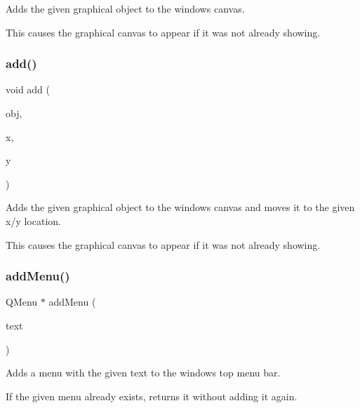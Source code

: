 Adds the given graphical object to the window\textquotesingle{}s canvas. 

This causes the graphical canvas to appear if it was not already showing. \mbox{\label{classsgl_1_1GWindow_ac302bb932e3905e5d368ce735ad8444c}} 
\subsubsection{\texorpdfstring{add()}{add()}\hspace{0.1cm}{\footnotesize\ttfamily [8/8]}}
{\footnotesize\ttfamily void add (\begin{DoxyParamCaption}\item[{\mbox{\hyperlink{classsgl_1_1GObject}{G\+Object}} \&}]{obj,  }\item[{double}]{x,  }\item[{double}]{y }\end{DoxyParamCaption})\hspace{0.3cm}{\ttfamily [virtual]}}



Adds the given graphical object to the window\textquotesingle{}s canvas and moves it to the given x/y location. 

This causes the graphical canvas to appear if it was not already showing. \mbox{\label{classsgl_1_1GWindow_afffea482963d5566e97ccccb1f94a4e2}} 
\subsubsection{\texorpdfstring{add\+Menu()}{addMenu()}}
{\footnotesize\ttfamily Q\+Menu $\ast$ add\+Menu (\begin{DoxyParamCaption}\item[{const std\+::string \&}]{text }\end{DoxyParamCaption})\hspace{0.3cm}{\ttfamily [virtual]}}



Adds a menu with the given text to the window\textquotesingle{}s top menu bar. 

If the given menu already exists, returns it without adding it again. \mbox{\label{classsgl_1_1GWindow_a43efd24277d68e749443cb7c36b65f4b}} 
